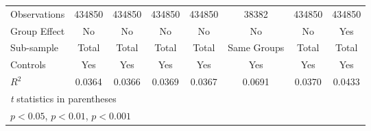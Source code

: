 {\begin{tabular}{l*{7}{c}}
\hline
Observations    &   434850         &   434850         &   434850         &   434850         &    38382         &   434850         &   434850         \\
Group Effect    &       No         &       No         &       No         &       No         &       No         &       No         &      Yes         \\
Sub-sample      &    Total         &    Total         &    Total         &    Total         &Same Groups         &    Total         &    Total         \\
Controls        &      Yes         &      Yes         &      Yes         &      Yes         &      Yes         &      Yes         &      Yes         \\
$ R^2 $         &   0.0364         &   0.0366         &   0.0369         &   0.0367         &   0.0691         &   0.0370         &   0.0433         \\
\hline\hline
\multicolumn{8}{l}{\footnotesize \textit{t} statistics in parentheses}\\
\multicolumn{8}{l}{\footnotesize \sym{*} \(p<0.05\), \sym{**} \(p<0.01\), \sym{***} \(p<0.001\)}\\
\end{tabular}
}
